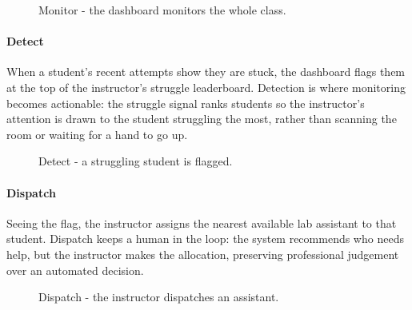 \begin{figure}[H]
    \centering
    \caption{Monitor - the dashboard monitors the whole class.}
    \label{fig:storyboard}
\end{figure}

\newpage
\paragraph{Detect} When a student's recent attempts show they are stuck, the dashboard flags them at the top of the instructor's struggle leaderboard.
Detection is where monitoring becomes actionable: the struggle signal ranks students so the instructor's attention is drawn to the student struggling the most, rather than scanning the room or waiting for a hand to go up.

\begin{figure}[H]
    \centering
    \caption{Detect - a struggling student is flagged.}
    \label{fig:sb-detect}
\end{figure}

\newpage
\paragraph{Dispatch} Seeing the flag, the instructor assigns the nearest available lab assistant to that student.
Dispatch keeps a human in the loop: the system recommends who needs help, but the instructor makes the allocation, preserving professional judgement over an automated decision.

\begin{figure}[H]
    \centering
    \caption{Dispatch - the instructor dispatches an assistant.}
    \label{fig:sb-dispatch}
\end{figure}

